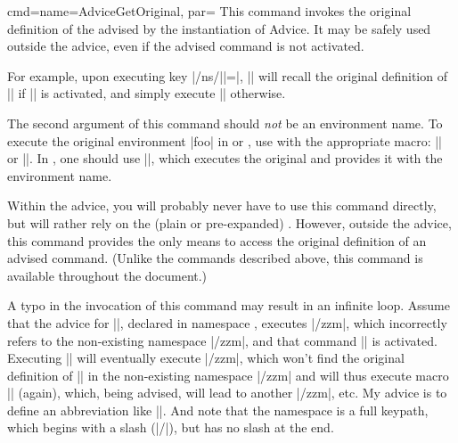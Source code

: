 \documentclass[a4paper,11pt]{article}
\begin{document}
\begin{doc}{cmd={name=AdviceGetOriginal, par=}}
  This command invokes the original definition of the 
  advised by the  instantiation of Advice.  It may be safely
  used outside the advice, even if the advised command is not activated.

  For example, upon executing key |/ns/||=|,
  || will recall the original definition of |\foo|
  if |\foo| is activated, and simply execute |\foo| otherwise.

  The second argument of this command should \emph{not} be an environment name.
  To execute the original environment |foo| in  or
  , use  with the appropriate macro:
  || or ||.  In
  , one should use ||, which
    executes the original  and provides it with the environment name.

  Within the advice, you will probably never have to use this command directly,
  but will rather rely on the (plain or pre-expanded) .
  However, outside the advice, this command provides the only means to
  access the original definition of an advised command.  (Unlike the
  commands described above, this command is available throughout the
  document.)
  
  \begin{tcolorbox}[warning]
    A typo in the invocation of this command may result in an infinite loop.
    Assume that the advice for |\foo|, declared in namespace ,
    executes |{/zzm}{\foo}|, which incorrectly refers
    to the non-existing namespace |/zzm|, and that command |\foo| is activated.
    Executing |\foo| will eventually execute
    |{/zzm}{\foo}|, which won't find the original
    definition of |\foo| in the non-existing namespace |/zzm| and will thus
    execute macro |\foo| (again), which, being advised, will lead to another
    |{/zzm}{\foo}|, etc.  My advice is to define an
    abbreviation like |\def\mmzAdviceGetOriginal{\AdviceGetOriginal{/mmz}}|.
    And note that the name\-space is a full keypath, which begins with a slash
    (|/|), but has no slash at the end.
  \end{tcolorbox}  
\end{doc}
    
\end{document}
